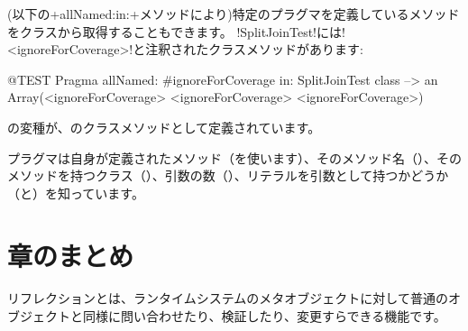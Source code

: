 \documentclass[a4paper,10pt,twoside]{book}
\begin{document}
(以下の\ct+allNamed:in:+メソッドにより)特定のプラグマを定義しているメソッドをクラスから取得することもできます。
\ct!SplitJoinTest!には\ct!<ignoreForCoverage>!と注釈されたクラスメソッドがあります:

\begin{code}{@TEST}
Pragma allNamed: #ignoreForCoverage in: SplitJoinTest class  --> an Array(<ignoreForCoverage> <ignoreForCoverage> <ignoreForCoverage>)
\end{code}

の変種が、のクラスメソッドとして定義されています。

プラグマは自身が定義されたメソッド（を使います）、そのメソッド名（）、そのメソッドを持つクラス（）、引数の数（）、リテラルを引数として持つかどうか（と）を知っています。


\section{章のまとめ}

リフレクションとは、ランタイムシステムのメタオブジェクトに対して普通のオブジェクトと同様に問い合わせたり、検証したり、変更すらできる機能です。
\end{document}
